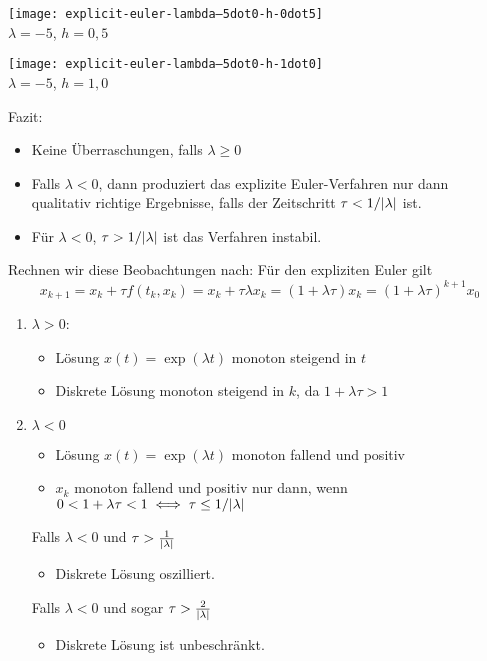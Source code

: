 \begin{center}
	\begin{minipage}{0.49\textwidth}
		\centering
		\texttt{[image: explicit-euler-lambda--5dot0-h-0dot5]} \\
		$\lambda=-5$, $h = 0{,}5$
	\end{minipage}
	\begin{minipage}{0.49\textwidth}
		\centering
		\texttt{[image: explicit-euler-lambda--5dot0-h-1dot0]} \\
		$\lambda=-5$, $h = 1{,}0$
	\end{minipage}
\end{center}
%
Fazit:
\begin{itemize}[topsep=-\parskip, nolistsep]
	\item Keine Überraschungen, falls $\lambda \ge 0$
	\item Falls $\lambda <0$, dann produziert das explizite Euler-Verfahren nur dann qualitativ richtige Ergebnisse, falls der Zeitschritt $\tau < 1/\lvert \lambda \rvert$ ist.
	\item Für $\lambda < 0$, $\tau > 1/\lvert \lambda \rvert$ ist das Verfahren instabil.
\end{itemize}

Rechnen wir diese Beobachtungen nach: Für den expliziten Euler gilt
\begin{equation*}
	x_{k+1}=x_k+\tau f \left(t_k,x_k \right)=x_k+\tau \lambda x_k=\left(1+\lambda \tau \right) x_k=\left(1+\lambda \tau \right)^{k+1}x_0
\end{equation*}

\begin{enumerate}[label=Fall \arabic*:, leftmargin=*]
	\item $\lambda >0$:
	\begin{itemize}[label=--]
		\item Lösung $x(t)=\exp \left(\lambda t \right)$ monoton steigend in $t$
		\item Diskrete Lösung monoton steigend in $k$, da $1+\lambda \tau >1$
	\end{itemize}
	\item $\lambda <0$
	\begin{itemize}[label=--]
		\item Lösung $x(t)=\exp \left(\lambda t \right)$ monoton fallend und positiv
		\item $x_k$ monoton fallend und positiv nur dann, wenn $0<1+\lambda \tau <1 \iff \tau \leq 1/\lvert \lambda \rvert$
	\end{itemize}
	Falls $\lambda < 0$ und $\tau > \frac{1}{\lvert \lambda \rvert}$
	\begin{itemize}[label=--]
		\item Diskrete Lösung oszilliert.
	\end{itemize}
	Falls $\lambda < 0$ und sogar $\tau > \frac{2}{\lvert \lambda \rvert}$
	\begin{itemize}[label=--]
		\item Diskrete Lösung ist unbeschränkt.
	\end{itemize}
\end{enumerate}


